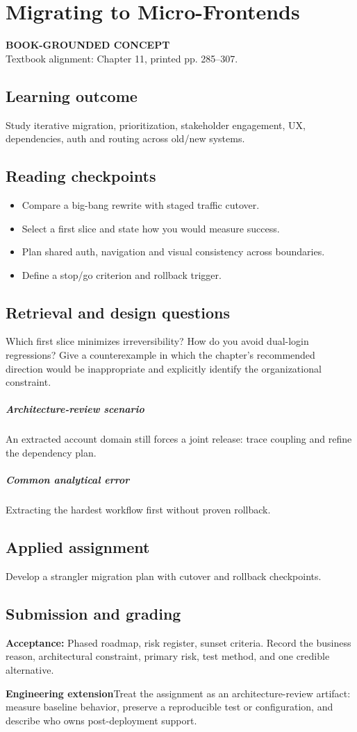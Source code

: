 \documentclass[11pt,letterpaper,oneside]{report}
\newcommand{\based}[1]{\begin{sourcebox}\textbf{BOOK-GROUNDED CONCEPT}\\#1\end{sourcebox}}
\newcommand{\criterion}[1]{\textbf{Acceptance:} #1}
\begin{document}
\chapter{Migrating to Micro-Frontends}
\based{Textbook alignment: Chapter 11, printed pp. 285--307.}
\section{Learning outcome}
Study iterative migration, prioritization, stakeholder engagement, UX, dependencies, auth and routing across old/new systems.
\section{Reading checkpoints}
\begin{itemize}\item Compare a big-bang rewrite with staged traffic cutover.
\item Select a first slice and state how you would measure success.
\item Plan shared auth, navigation and visual consistency across boundaries.
\item Define a stop/go criterion and rollback trigger.
\end{itemize}
\section{Retrieval and design questions}
Which first slice minimizes irreversibility? How do you avoid dual-login regressions? Give a counterexample in which the chapter's recommended direction would be inappropriate and explicitly identify the organizational constraint.
\paragraph{Architecture-review scenario} An extracted account domain still forces a joint release: trace coupling and refine the dependency plan.
\paragraph{Common analytical error} Extracting the hardest workflow first without proven rollback.
\section{Applied assignment}
Develop a strangler migration plan with cutover and rollback checkpoints.
\section{Submission and grading}
\criterion{Phased roadmap, risk register, sunset criteria. Record the business reason, architectural constraint, primary risk, test method, and one credible alternative.}
\begin{engineerbox}\textbf{Engineering extension}\newline Treat the assignment as an architecture-review artifact: measure baseline behavior, preserve a reproducible test or configuration, and describe who owns post-deployment support.\end{engineerbox}
\end{document}
